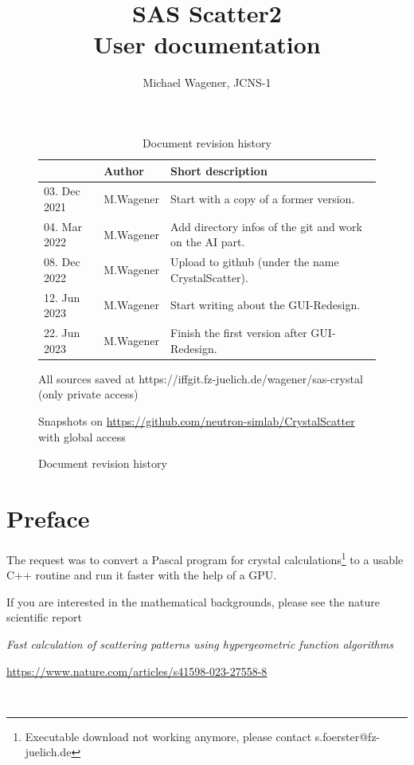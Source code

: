 \documentclass[11pt]{article} %
\author{Michael Wagener, JCNS-1}
\title{SAS Scatter2 \\[1ex] {\large User documentation}}
\begin{document}
\maketitle
\tableofcontents %

\begin{figure}[b] %
\begin{longtable}{|p{2.7cm}|p{2.6cm}|p{10.3cm}|}
\caption{Document revision history} \\
\hline\rowcolor{rowcolor}{\bf Date} & {\bf Author} & {\bf Short description} \\
\endfirsthead
\hline
03. Dec 2021 & M.Wagener & Start with a copy of a former version. \\ \hline
04. Mar 2022 & M.Wagener & Add directory infos of the git and work on the AI part. \\ \hline
08. Dec 2022 & M.Wagener & Upload to github (under the name CrystalScatter). \\ \hline
12. Jun 2023 & M.Wagener & Start writing about the GUI-Redesign. \\ \hline
22. Jun 2023 & M.Wagener & Finish the first version after GUI-Redesign. \\ \hline
\end{longtable}

\centerline{All sources saved at https://iffgit.fz-juelich.de/wagener/sas-crystal (only private access)}
\centerline{Snapshots on \url{https://github.com/neutron-simlab/CrystalScatter} with global access}
\end{figure}

\clearpage %


\section{Preface}

The request was to convert a Pascal program for crystal calculations\footnote{Executable download not working anymore, please contact s.foerster@fz-juelich.de}
to a usable C++ routine and run it faster with the help of a GPU.

If you are interested in the mathematical backgrounds, please see the nature scientific report \\
\centerline{\it Fast calculation of scattering patterns using hypergeometric function algorithms}
\centerline{\url{https://www.nature.com/articles/s41598-023-27558-8}} \\
\end{document}
